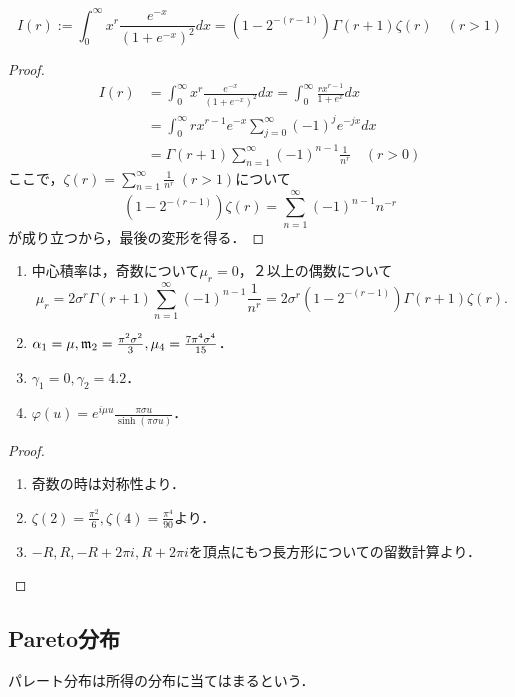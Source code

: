 \documentclass[uplatex,dvipdfmx]{jsreport}
\begin{document}
\begin{lemma}
    \[I(r):=\int^\infty_0x^r\frac{e^{-x}}{(1+e^{-x})^2}dx=(1-2^{-(r-1)})\Gamma(r+1)\zeta(r)\quad(r>1)\]
\end{lemma}
\begin{proof}
    \begin{align*}
        I(r)&=\int^\infty_0x^r\frac{e^{-x}}{(1+e^{-x})^2}dx=\int^\infty_0\frac{rx^{r-1}}{1+e^x}dx\\
        &=\int^\infty_0rx^{r-1}e^{-x}\sum^\infty_{j=0}(-1)^je^{-jx}dx\\
        &=\Gamma(r+1)\sum^\infty_{n=1}(-1)^{n-1}\frac{1}{n^r}\quad(r>0)
    \end{align*}
    ここで，$\zeta(r)=\sum^\infty_{n=1}\frac{1}{n^r}\;(r>1)$について
    \[(1-2^{-(r-1)})\zeta(r)=\sum^\infty_{n=1}(-1)^{n-1}n^{-r}\]
    が成り立つから，最後の変形を得る．
\end{proof}

\begin{proposition}\mbox{}
    \begin{enumerate}
        \item 中心積率は，奇数について$\mu_r=0$，２以上の偶数について
        \[\mu_r=2\sigma^r\Gamma(r+1)\sum^\infty_{n=1}(-1)^{n-1}\frac{1}{n^r}=2\sigma^r(1-2^{-(r-1)})\Gamma(r+1)\zeta(r).\]
        \item $\alpha_1=\mu,\mathfrak{m}_2=\frac{\pi^2\sigma^2}{3},\mu_4=\frac{7\pi^4\sigma^4}{15}$．
        \item $\gamma_1=0,\gamma_2=4.2$．
        \item $\varphi(u)=e^{i\mu u}\frac{\pi\sigma u}{\sinh(\pi\sigma u)}$．
    \end{enumerate}
\end{proposition}
\begin{proof}\mbox{}
    \begin{enumerate}
        \item 奇数の時は対称性より．
        \item $\zeta(2)=\frac{\pi^2}{6},\zeta(4)=\frac{\pi^4}{90}$より．
        \item $-R,R,-R+2\pi i,R+2\pi i$を頂点にもつ長方形についての留数計算より．
    \end{enumerate}
\end{proof}

\subsection{Pareto分布}

\begin{tcolorbox}[colframe=ForestGreen, colback=ForestGreen!10!white,breakable,colbacktitle=ForestGreen!40!white,coltitle=black,fonttitle=\bfseries\sffamily,
title=]
    パレート分布は所得の分布に当てはまるという．
\end{tcolorbox}
\end{document}
